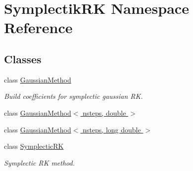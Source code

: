 \hypertarget{namespaceSymplectikRK}{\section{Symplectik\-R\-K Namespace Reference}
\label{namespaceSymplectikRK}
}
\subsection*{Classes}
\begin{DoxyCompactItemize}
\item 
class \hyperlink{classSymplectikRK_1_1GaussianMethod}{Gaussian\-Method}
\begin{DoxyCompactList}\small\item\em Build coefficients for symplectic gaussian R\-K. \end{DoxyCompactList}\item 
class \hyperlink{classSymplectikRK_1_1GaussianMethod_3_01nsteps_00_01double_01_4}{Gaussian\-Method$<$ nsteps, double $>$}
\item 
class \hyperlink{classSymplectikRK_1_1GaussianMethod_3_01nsteps_00_01long_01double_01_4}{Gaussian\-Method$<$ nsteps, long double $>$}
\item 
class \hyperlink{classSymplectikRK_1_1SymplecticRK}{Symplectic\-R\-K}
\begin{DoxyCompactList}\small\item\em Symplectic R\-K method. \end{DoxyCompactList}\end{DoxyCompactItemize}
